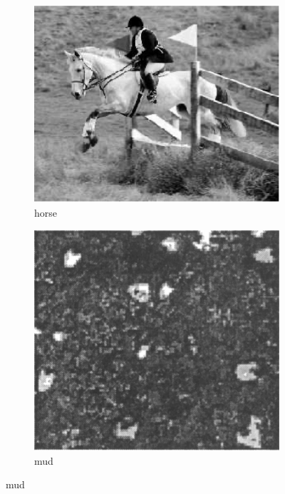 \documentclass[11pt]{article}
\begin{document}
\begin{figure}[ht!]
\begin{subfigure}[]{0.333\linewidth}
        \includegraphics[width=\linewidth]{figs_for_latex_only/image2.jpg}
        \caption{horse}
    \end{subfigure}%
    \hfill%
    \begin{subfigure}[]{0.333\linewidth}
        \centering
        \includegraphics[width=\linewidth]{figs_for_latex_only/image3.jpg}
        \caption{mud}
    \end{subfigure}%
\end{figure}
\end{document}
